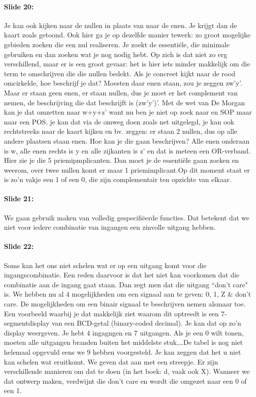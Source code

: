 \documentclass[10pt,a4paper]{book}
\begin{document}
\paragraph{Slide 20:} Je kan ook kijken naar de nullen in plaats van naar de enen. Je krijgt dan de kaart zoals getoond. Ook hier ga je op dezelfde manier tewerk: zo groot mogelijke gebieden zoeken die een nul realiseren. Je zoekt de essenti\"ele, die minimale gebruiken en dan zoeken wat je nog nodig hebt. Op zich is dat niet zo erg verschillend, maar er is een groot gevaar: het is hier iets minder makkelijk om die term te omschrijven die die nullen bedekt. Als je concreet kijkt naar de rood omcirkelde, hoe beschrijf je dat? Moesten daar enen staan, zou je zeggen zw'y'. Maar er staan geen enen, er staan nullen, dus je moet er het complement van nemen, de beschrijving die dat beschrijft is (zw'y')'. Met de wet van De Morgan kan je dat omzetten naar w+y+z' want nu ben je niet op zoek naar en SOP maar naar een POS. je kan dat via de omweg doen zoals net uitgelegd, je kan ook rechtstreeks naar de kaart kijken en bv. zeggen: er staan 2 nullen, dus op alle andere plaatsen staan enen. Hoe kan je die gaan beschrijven? Alle enen onderaan is w, alle enen rechts is y en alle zijkanten is z' en dat is meteen een OR-verband.\\
Hier zie je die 5 priemipmplicanten. Dan moet je de essenti\"ele gaan zoeken en weerom, over twee nullen komt er maar 1 priemimplicant.Op dit moment staat er is zo'n vakje een 1 of een 0, die zijn complementair ten opzichte van elkaar. 

\paragraph{Slide 21:} We gaan gebruik maken van volledig gespecifi\"eerde functies. Dat betekent dat we niet voor iedere combinatie van ingangen een zinvolle uitgang hebben.

\paragraph{Slide 22:} Soms kan het ons niet schelen wat er op een uitgang komt voor die ingangscombinatie. Een reden daarvoor is dat het niet kan voorkomen dat die combinatie aan de ingang gaat staan. Dan zegt men dat die uitgang ``don't  care" is. We hebben nu al 4 mogelijkheden om een signaal aan te geven: 0, 1, Z \& don't care. De mogelijkheden om een binair signaal te beschrijven nemen alsmaar toe. Een voorbeeld waarbij je dat makkelijk ziet waarom dit optreedt is een 7-segmentdisplay van een BCD-getal (binary-coded decimal). Je kan dat op zo'n display weergeven. Je hebt 4 ingagngen en 7 uitgangen. Als je een 0 wilt tonen, moeten alle uitgangen branden buiten het middelste stuk,\ldots De tabel is nog niet helemaal opgevuld eens we 9 hebben voorgesteld. Je kan zeggen dat het u niet kan schelen wat eruitkomt. We geven dat aan met een streepje. Er zijn verschillende manieren om dat te doen (in het boek: d, vaak ook X). Wanneer we dat ontwerp maken, verdwijnt die don't care en wordt die omgezet naar een 0 of een 1.
\end{document}
